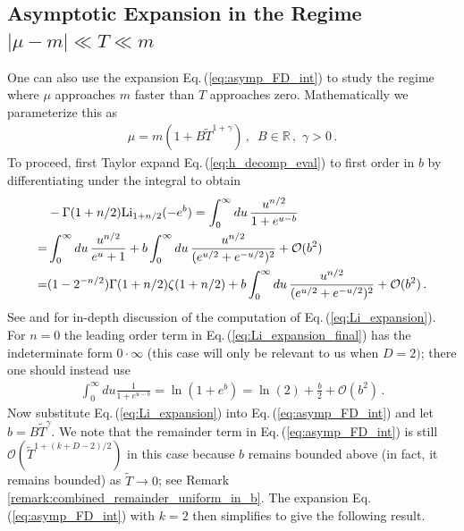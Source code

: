 \documentclass[sn-mathphys,Numbered]{sn-jnl}
\newcommand{\req}[1]{Eq.\,(\ref{#1})}
\begin{document}
\subsection{Asymptotic Expansion in the Regime $|\mu-m|\ll T\ll m$}\label{sec:decaying_b}
One can also use the expansion \req{eq:asymp_FD_int} to study the regime where $\mu$ approaches $m$ faster than $T$ approaches zero. Mathematically we parameterize this as 
\begin{align}\label{eq:mu_decay_faster}
\mu=m(1+B\widetilde{T}^{1+\gamma})\,,\,\,\, B\in\mathbb{R}\,,\,\, \gamma>0\,. 
\end{align}
 To proceed, first Taylor expand \req{eq:h_decomp_eval} to first order in $b$ by differentiating under the integral to obtain
\begin{align}\label{eq:Li_expansion}
 &-\Gamma(1+n/2)\mathrm{Li}_{1+n/2}(-e^b) =\int_0^\infty du \, \frac{u^{n/2}}{1+e^{u-b}} \\
 =&\int_0^\infty du\,\frac{u^{n/2}}{e^u+1}+b\int_0^\infty du\,\frac{u^{n/2}}{(e^{u/2}+e^{-u/2})^2} +\mathcal{O}(b^2)\notag\\
 =&(1 - 2^{-n/2}) \Gamma(1 + n/2) \zeta(1 + n/2)+ b\int_0^\infty du\,\frac{u^{n/2}}{(e^{u/2}+e^{-u/2})^2} +\mathcal{O}(b^2)\,.\label{eq:Li_expansion_final}
\end{align}
See \cite{dingle1957fermi} and \cite{10.1063/1.1350634} for in-depth discussion of the computation of \req{eq:Li_expansion}. For $n=0$ the leading order term in \req{eq:Li_expansion_final} has the indeterminate form $0\cdot \infty$ (this case will only be relevant to us when $D=2)$; there one should instead use
\begin{align}
\int_0^\infty du \frac{1}{1+e^{u-b}}=\ln(1+e^b)= \ln(2)+\frac{b}{2}+\mathcal{O}(b^2)\,.
\end{align}
Now substitute \req{eq:Li_expansion} into \req{eq:asymp_FD_int} and let $b=B\widetilde{T}^\gamma$. We note that the remainder term in \req{eq:asymp_FD_int} is still $\mathcal{O}(\widetilde{T}^{1+(k+D-2)/2})$ in this case because $b$ remains bounded above (in fact, it remains bounded) as $\widetilde{T}\to 0$; see Remark \ref{remark:combined_remainder_uniform_in_b}. The expansion \req{eq:asymp_FD_int} with $k=2$ then simplifies to give the following result.
\end{document}
